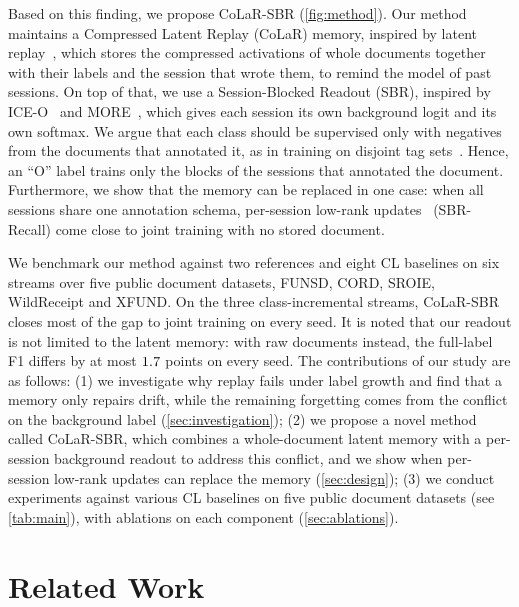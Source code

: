\documentclass[10pt,twocolumn,letterpaper]{article}
\begin{document}
Based on this finding, we propose CoLaR-SBR (\cref{fig:method}). Our method maintains a Compressed Latent Replay (CoLaR) memory, inspired by latent replay~\citep{hayes2020remind,pellegrini2020latent}, which stores the compressed activations of whole documents together with their labels and the session that wrote them, to remind the model of past sessions. On top of that, we use a Session-Blocked Readout (SBR), inspired by ICE-O~\citep{liu2023ice} and MORE~\citep{kim2022more}, which gives each session its own background logit and its own softmax. We argue that each class should be supervised only with negatives from the documents that annotated it, as in training on disjoint tag sets~\citep{greenberg2018marginal}. Hence, an ``O'' label trains only the blocks of the sessions that annotated the document. Furthermore, we show that the memory can be replaced in one case: when all sessions share one annotation schema, per-session low-rank updates~\citep{hu2022lora} (SBR-Recall) come close to joint training with no stored document.

We benchmark our method against two references and eight CL baselines on six streams over five public document datasets, FUNSD, CORD, SROIE, WildReceipt and XFUND. On the three class-incremental streams, CoLaR-SBR closes most of the gap to joint training on every seed. It is noted that our readout is not limited to the latent memory: with raw documents instead, the full-label F1 differs by at most $1.7$ points on every seed. The contributions of our study are as follows: (1) we investigate why replay fails under label growth and find that a memory only repairs drift, while the remaining forgetting comes from the conflict on the background label (\cref{sec:investigation}); (2) we propose a novel method called CoLaR-SBR, which combines a whole-document latent memory with a per-session background readout to address this conflict, and we show when per-session low-rank updates can replace the memory (\cref{sec:design}); (3) we conduct experiments against various CL baselines on five public document datasets (see \cref{tab:main}), with ablations on each component (\cref{sec:ablations}).
\section{Related Work}
\label{sec:related}
\end{document}
